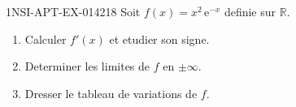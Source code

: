 \begin{exercice}{1NSI-APT-EX-014}{2}{18}
Soit $f(x) = x^2\,\mathrm{e}^{-x}$ definie sur $\mathbb{R}$.
\begin{enumerate}
  \item Calculer $f'(x)$ et etudier son signe.
  \item Determiner les limites de $f$ en $\pm\infty$.
  \item Dresser le tableau de variations de $f$.
\end{enumerate}

\end{exercice}
